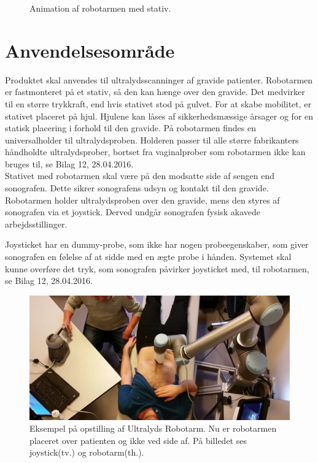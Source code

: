 \begin{figure}[H]
\begin{minipage}{0.55\textwidth}
		\caption{Animation af robotarmen med stativ.}
		\label{Robotstativ}
	\end{minipage}
\end{figure}

\section{Anvendelsesområde}
Produktet skal anvendes til ultralydsscanninger af gravide patienter. Robotarmen er fastmonteret på et stativ, så den kan hænge over den gravide. Det medvirker til en større trykkraft, end hvis stativet stod på gulvet. For at skabe mobilitet, er stativet placeret på hjul. Hjulene kan låses af sikkerhedsmæssige årsager og for en statisk placering i forhold til den gravide. På robotarmen findes en universalholder til ultralydsproben. Holderen passer til alle større fabrikanters håndholdte ultralydsprober, bortset fra vaginalprober som robotarmen ikke kan bruges til, se Bilag 12, 28.04.2016.\\

Stativet med robotarmen skal være på den modsatte side af sengen end sonografen. Dette sikrer sonografens udsyn og kontakt til den gravide. \\
Robotarmen holder ultralydsproben over den gravide, mens den styres af sonografen via et joystick. Derved undgår sonografen fysisk akavede arbejdsstillinger.

Joysticket har en dummy-probe, som ikke har nogen probeegenskaber, som giver sonografen en følelse af at sidde med en ægte probe i hånden.
Systemet skal kunne overføre det tryk, som sonografen påvirker joysticket med, til robotarmen, se Bilag 12, 28.04.2016.
 

\begin{figure}[H]\centering
	\includegraphics[width = 1.0\textwidth]{Figurer/ergonomiskLosning.jpg}
	\caption{Eksempel på opstilling af Ultralyds Robotarm. Nu er robotarmen placeret over patienten og ikke ved side af. På billedet ses joystick(tv.) og robotarm(th.).  }
	\label{ergonomiskLosning}
\end{figure}


